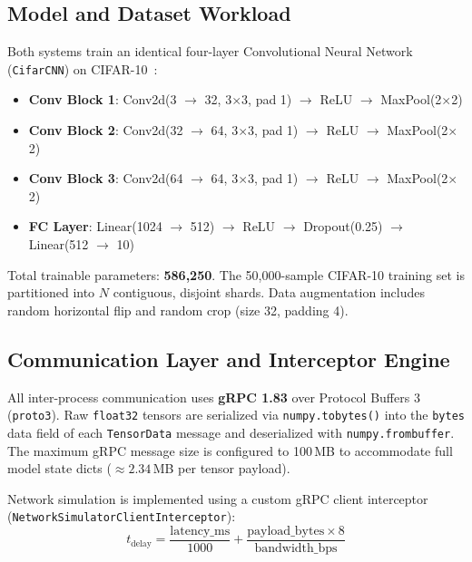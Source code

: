 \documentclass[conference]{IEEEtran}
\begin{document}
\subsection{Model and Dataset Workload}
Both systems train an identical four-layer Convolutional Neural Network (\texttt{CifarCNN}) on CIFAR-10~\cite{krizhevsky2009learning}:
\begin{itemize}
    \item \textbf{Conv Block 1}: Conv2d(3 $\to$ 32, 3$\times$3, pad 1) $\to$ ReLU $\to$ MaxPool(2$\times$2)
    \item \textbf{Conv Block 2}: Conv2d(32 $\to$ 64, 3$\times$3, pad 1) $\to$ ReLU $\to$ MaxPool(2$\times$2)
    \item \textbf{Conv Block 3}: Conv2d(64 $\to$ 64, 3$\times$3, pad 1) $\to$ ReLU $\to$ MaxPool(2$\times$2)
    \item \textbf{FC Layer}: Linear(1024 $\to$ 512) $\to$ ReLU $\to$ Dropout(0.25) $\to$ Linear(512 $\to$ 10)
\end{itemize}
Total trainable parameters: \textbf{586,250}. The 50,000-sample CIFAR-10 training set is partitioned into $N$ contiguous, disjoint shards. Data augmentation includes random horizontal flip and random crop (size 32, padding 4).

\subsection{Communication Layer and Interceptor Engine}
All inter-process communication uses \textbf{gRPC 1.83} over Protocol Buffers 3 (\texttt{proto3}). Raw \texttt{float32} tensors are serialized via \texttt{numpy.tobytes()} into the \texttt{bytes} data field of each \texttt{TensorData} message and deserialized with \texttt{numpy.frombuffer}. The maximum gRPC message size is configured to 100\,MB to accommodate full model state dicts ($\approx 2.34$\,MB per tensor payload).

Network simulation is implemented using a custom gRPC client interceptor (\texttt{NetworkSimulatorClientInterceptor}):
\begin{equation}
    t_{\text{delay}} = \frac{\text{latency\_ms}}{1000} + \frac{\text{payload\_bytes} \times 8}{\text{bandwidth\_bps}}
\end{equation}
\end{document}

